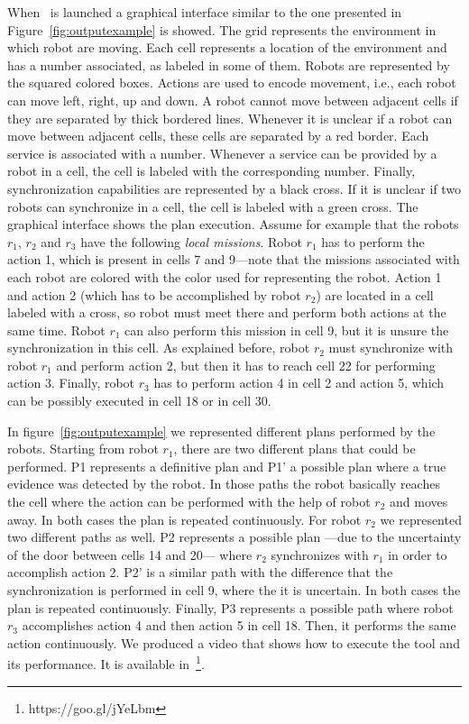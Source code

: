 When  \toolName\ is launched a graphical interface similar to the one presented  in Figure~\ref{fig:outputexample} is showed.
The grid represents the environment in which robot are moving.
Each cell represents a location of the environment and has a number associated, as labeled in some of them.
Robots are represented by the squared colored boxes.
Actions are used to encode movement, i.e., each robot can move left, right, up and down.
A robot  cannot move between adjacent cells if they are separated by thick bordered lines.
Whenever  it is unclear if a robot can move between adjacent cells, these cells are separated by a red border.
Each service is associated with a number.
Whenever a service can be provided by a robot in a cell, the cell is labeled with the corresponding number.
Finally, synchronization capabilities are represented by a black cross.
If it is unclear if two robots can synchronize in a cell, the cell is labeled with a green cross.
The graphical interface shows the plan execution.
Assume for example that the robots $r_1$, $r_2$ and $r_3$ have the following \emph{local missions}.
Robot $r_1$ has to perform the action 1, which is present in cells 7 and 9---note that the missions associated with each robot are colored with the color used for representing the robot.
Action 1 and action 2 (which has to be accomplished by robot $r_2$) are located in a cell labeled with a cross, so robot must meet there and perform both actions at the same time.
Robot $r_1$ can also perform this mission in cell 9, but it is unsure the synchronization in this cell.
As explained before, robot $r_2$ must synchronize with robot $r_1$ and perform action 2, but then it has to reach cell 22 for performing action 3.
Finally, robot $r_3$ has to perform action 4 in cell 2 and action 5, which can be possibly executed in cell 18 or in cell 30.

In figure~\ref{fig:outputexample} we represented different plans performed by the robots. 
Starting from robot $r_1$, there are two different plans that could be performed.
P1 represents a definitive plan and P1' a possible plan where a true evidence was detected by the robot.
In those paths the robot basically reaches the cell where the action can be performed with the help of robot $r_2$ and moves away. 
In both cases the plan is repeated continuously.
For robot $r_2$ we represented two different paths as well.
P2 represents a possible plan ---due to the uncertainty of the door between cells 14 and 20--- where $r_2$ synchronizes with $r_1$ in order to accomplish action 2.
P2' is a similar path with the difference that the synchronization is performed in cell 9, where the it is uncertain.
In both cases the plan is repeated continuously.
Finally, P3 represents a possible path where robot $r_3$ accomplishes action 4 and then action 5 in cell 18.
Then, it performs the same action continuously.
We produced a video that shows how to execute the tool and its performance. 
It is available in~\footnote{https://goo.gl/jYeLbm}.

